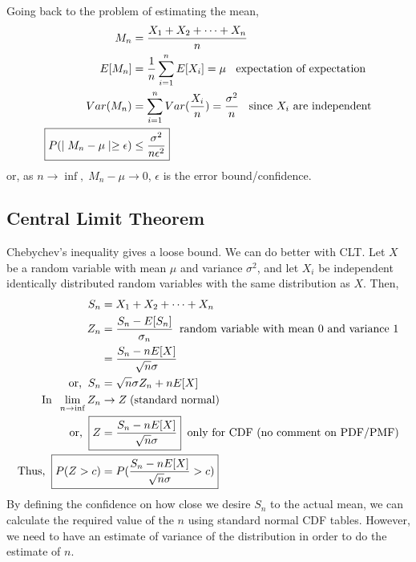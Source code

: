 \documentclass[../probability-notes.tex]{subfiles}
\begin{document}
    Going back to the problem of estimating the mean,
    \begin{align*}
        M_{n} &= \frac{X_{1} + X_{2} + \cdots + X_{n}}{n} \\
        E[M_{n}] &= \frac{1}{n} \sum_{i=1}^{n} E[X_{i}] = \mu \text{\;\; expectation of expectation} \\
        Var(M_{n}) &= \sum_{i=1}^{n} Var(\frac{X_{i}}{n}) = \frac{\sigma^{2}}{n} \text{\;\; since $X_{i}$ are independent} \\
        \Aboxed{P(\mid M_{n} - \mu \mid \geq \epsilon) &\leq \frac{\sigma^{2}}{n\epsilon^{2}}}
    \end{align*}
    or, as $n \rightarrow \inf,\; M_{n} - \mu \rightarrow 0$, $\epsilon$ is the error bound/confidence.

    \subsection{Central Limit Theorem}
    Chebychev's inequality gives a loose bound. We can do better with CLT. Let $X$ be a random variable with mean $\mu$ and variance $\sigma^{2}$, and let $X_{i}$ be independent identically distributed random variables with the same distribution as $X$. Then,
    \begin{align*}
        S_{n} &= X_{1} + X_{2} + \cdots + X_{n}\\
        Z_{n} &= \frac{S_{n} - E[S_{n}]}{\sigma_{n}} \text{\;\;random variable with mean $0$ and variance $1$} \\
             &= \frac{S_{n} - nE[X]}{\sqrt{n} \sigma}\\
        \text{or,\;\;} S_{n} &= \sqrt{n} \sigma Z_{n} + nE[X] \\
        \text{In\;\;} \lim_{n \to \inf} Z_{n} &\rightarrow Z \text{\;(standard normal)}\\
        \text{or,\;\;} \Aboxed{Z &= \frac{S_{n} - nE[X]}{\sqrt{n} \sigma}} \text{\;\;only for CDF (no comment on PDF/PMF)}\\
        \text{Thus,\;\;} \Aboxed{P(Z > c) &= P(\frac{S_{n} - nE[X]}{\sqrt{n} \sigma} > c)}
    \end{align*}
    By defining the confidence on how close we desire $S_{n}$ to the actual mean, we can calculate the required value of the $n$ using standard normal CDF tables. However, we need to have an estimate of variance of the distribution in order to do the estimate of $n$.
\end{document}
